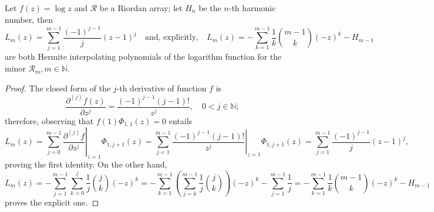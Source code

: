 
\begin{theorem}
\label{thm:log-Hermite-interpolating-poly-implicit}
Let $f(z)=\log{z}$ and $\mathcal{R}$ be a Riordan array; let $H_{n}$ be the
$n$-th harmonic number, then 
\begin{equation}
  \label{eq:log-Hermite-interpolating-poly}
  L_{m}(z) = \sum_{j=1}^{m-1}{\frac{(-1)^{j-1}}{j}{\left(z-1\right)^{j} }}
  \quad\text{and, explicitly,}\quad
  L_{m}(z) = - \sum_{k=1}^{m-1}\frac{1}{k}{{m-1}\choose{k}}{(-z)^{k}}- H_{m-1} 
\end{equation}
are both Hermite interpolating polynomials of the logarithm function for the minor
$\mathcal{R}_{m}, m\in\mathbb{N}$.
\end{theorem}

\begin{proof}
The closed form of the $j$-th derivative of function $f$ is 
$$\frac{\partial^{(j)}{f}(z)}{\partial{z}^{j}} =\frac{(-1)^{j-1}(j-1)!}{z^{j}}, \quad 0<j\in\mathbb{N};$$ 
therefore, observing that $f(1)\Phi_{1,1}(z)=0$ entails
\begin{displaymath}
  L_{m}(z) = \sum_{j=0}^{m-1}{ \left. \frac{\partial^{(j)}{f}}{\partial{z}^{j}} \right|_{z=1}\Phi_{1,j+1}(z)}
       = \sum_{j=1}^{m-1}{ \left. \frac{(-1)^{j-1}(j-1)!}{z^{j}} \right|_{z=1}\Phi_{1,j+1}(z)}
       = \sum_{j=1}^{m-1}{ \frac{(-1)^{j-1}}{j} (z-1)^{j}},
\end{displaymath}
proving the first identity. On the other hand,
\begin{displaymath}
  L_{m}(z) = - \sum_{j=1}^{m-1}{\sum_{k=0}^{j}{\frac{1}{j}{{j}\choose{k}}(-z)^{k}}}
       = - \sum_{k=1}^{m-1}{\left(\sum_{j=k}^{m-1}{\frac{1}{j}{{j}\choose{k}}}\right)}(-z)^{k} - \sum_{j=1}^{m-1}{\frac{1}{j}}
       = - \sum_{k=1}^{m-1}\frac{1}{k}{{m-1}\choose{k}}{(-z)^{k}}- H_{m-1} 
\end{displaymath}
proves the explicit one.
\end{proof}

